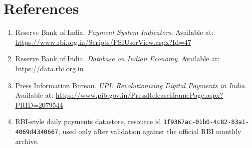 \documentclass[11pt]{article}
\begin{document}
\section*{References}

\begin{enumerate}
  \item Reserve Bank of India. \emph{Payment System Indicators}. Available at: \url{https://www.rbi.org.in/Scripts/PSIUserView.aspx?Id=47}
  \item Reserve Bank of India. \emph{Database on Indian Economy}. Available at: \url{https://data.rbi.org.in}
  \item Press Information Bureau. \emph{UPI: Revolutionizing Digital Payments in India}. Available at: \url{https://www.pib.gov.in/PressReleaseIframePage.aspx?PRID=2079544}
  \item RBI-style daily payments datastore, resource id \texttt{1f9367ac-01b0-4c82-83a1-4069d4340667}, used only after validation against the official RBI monthly archive.
\end{enumerate}
\end{document}
